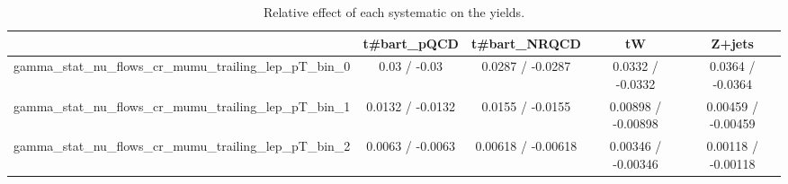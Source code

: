 \documentclass[10pt]{article}
\begin{document}
\begin{table}[htbp]
\begin{center}
\begin{tabular}{|c|c|c|c|c|}
\hline 
      & t#bar{t}_{pQCD}      & t#bar{t}_{NRQCD}      & tW      & Z+jets \\ 
\hline 
  gamma_stat_nu_flows_cr_mumu_trailing_lep_pT_bin_0 & 0.03 / -0.03 & 0.0287 / -0.0287 & 0.0332 / -0.0332 & 0.0364 / -0.0364 \\ 
  gamma_stat_nu_flows_cr_mumu_trailing_lep_pT_bin_1 & 0.0132 / -0.0132 & 0.0155 / -0.0155 & 0.00898 / -0.00898 & 0.00459 / -0.00459 \\ 
  gamma_stat_nu_flows_cr_mumu_trailing_lep_pT_bin_2 & 0.0063 / -0.0063 & 0.00618 / -0.00618 & 0.00346 / -0.00346 & 0.00118 / -0.00118 \\ 
\hline 
\end{tabular} 
\caption{Relative effect of each systematic on the yields.} 
\end{center} 
\end{table} 
\end{document}
